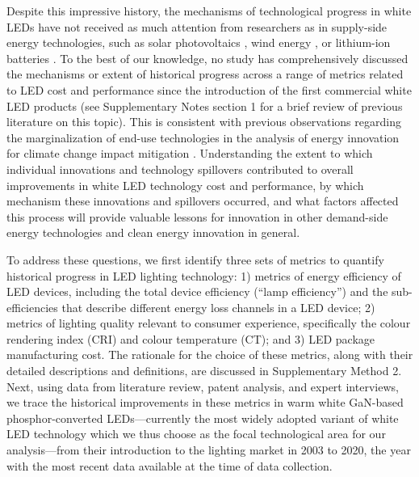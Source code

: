 \documentclass[parskip=full]{article}
\begin{document}
Despite this impressive history, the mechanisms of technological progress in white LEDs have not received as much attention from researchers as in supply-side energy technologies, such as solar photovoltaics \cite{kavlak2018evaluating, nemet2019solar}, wind energy \cite{qiu2012price, jennings2020policy}, or lithium-ion batteries \cite{Ziegler2021, Stephan2021}. To the best of our knowledge, no study has comprehensively discussed the mechanisms or extent of historical progress across a range of metrics related to LED cost and performance since the introduction of the first commercial white LED products (see Supplementary Notes section 1 for a brief review of previous literature on this topic). This is consistent with previous observations regarding the marginalization of end-use technologies in the analysis of energy innovation for climate change impact mitigation \cite{Wilson2012, Creutzig2018}. Understanding the extent to which individual innovations and technology spillovers contributed to overall improvements in white LED technology cost and performance, by which mechanism these innovations and spillovers occurred, and what factors affected this process will provide valuable lessons for innovation in other demand-side energy technologies and clean energy innovation in general.

To address these questions, we first identify three sets of metrics to quantify historical progress in LED lighting technology: 1) metrics of energy efficiency of LED devices, including the total device efficiency (“lamp efficiency”) and the sub-efficiencies that describe different energy loss channels in a LED device; 2) metrics of lighting quality relevant to consumer experience, specifically the colour rendering index (CRI) and colour temperature (CT); and 3) LED package manufacturing cost. The rationale for the choice of these metrics, along with their detailed descriptions and definitions, are discussed in Supplementary Method 2. Next, using data from literature review, patent analysis, and expert interviews, we trace the historical improvements in these metrics in warm white GaN-based phosphor-converted LEDs—currently the most widely adopted variant of white LED technology which we thus choose as the focal technological area for our analysis—from their introduction to the lighting market in 2003 to 2020, the year with the most recent data available at the time of data collection.
\end{document}
